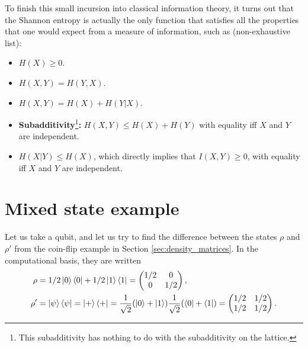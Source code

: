 To finish this small incursion into classical information theory, it turns out that the Shannon entropy is actually the only function that satisfies all the properties that one would expect from a measure of information, such as (non-exhaustive list):

\begin{itemize}
    \item $H(X) \geq 0$.
    \item $H(X, Y) = H(Y, X)$.
    \item $H(X, Y) = H(X) + H(Y|X)$.
    \item \textbf{Subadditivity}\footnote{This subadditivity has nothing to do with the subadditivity on the lattice.}\textbf{:} $H(X, Y) \leq H(X) + H(Y)$ with equality iff $X$ and $Y$ are independent.
    \item $H(X|Y) \leq H(X)$, which directly implies that $I(X, Y) \geq 0$, with equality iff $X$ and $Y$ are independent.
\end{itemize}



\newpage

\section{Mixed state example}
\label{app:mixed_example}

\setcounter{equation}{0}

Let us take a qubit, and let us try to find the difference between the states $\rho$ and $\rho'$ from the coin-flip example in Section \ref{sec:density_matrices}. In the computational basis, they are written
\begin{align}
    \rho &= 1/2 \ket{0}\bra{0} + 1/2 \ket{1}\bra{1} = \left(\begin{matrix}
        1/2 & 0\\
        0 & 1/2
    \end{matrix}\right),\\
    \rho' &= \ket{\psi}\bra{\psi} = \ket{+}\bra{+} = \frac{1}{\sqrt{2}}(\ket{0} + \ket{1})\frac{1}{\sqrt{2}}(\bra{0} + \bra{1}) = \left(\begin{matrix}
        1/2 & 1/2\\
        1/2 & 1/2
    \end{matrix}\right).
\end{align}

